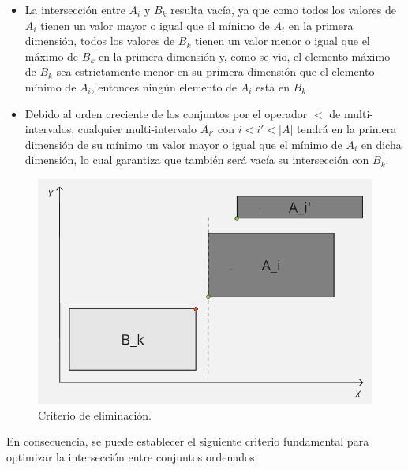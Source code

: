 \begin{itemize}
     \item La intersección entre $A_i$ y $B_k$ resulta vacía, ya que como todos los valores de $A_i$ tienen un valor mayor o igual que el mínimo de $A_i$ en la primera dimensión, todos los valores de $B_k$ tienen un valor menor o igual que el máximo de $B_k$ en la primera dimensión y, como se vio, el elemento máximo de $B_k$ sea estrictamente menor en su primera dimensión que el elemento mínimo de $A_i$, entonces ningún elemento de $A_i$ esta en $B_k$

    \item Debido al orden creciente de los conjuntos por el operador $<$ de multi-intervalos, cualquier multi-intervalo $A_{i'}$ con $i < i' < |A|$ tendrá en la primera dimensión de su mínimo un valor mayor o igual que el mínimo de $A_i$ en dicha dimensión, lo cual garantiza que también será vacía su intersección con $B_k$.
\end{itemize}

\begin{figure}[h]
    \centering
    \includegraphics[width=0.75\linewidth]{figures/Optimazaciones/Interseccion/criterio de elim.png}
    \caption{Criterio de eliminación.}
    \label{fig:criterio-eliminacion}
\end{figure}

En consecuencia, se puede establecer el siguiente criterio fundamental para optimizar la intersección entre conjuntos ordenados:



